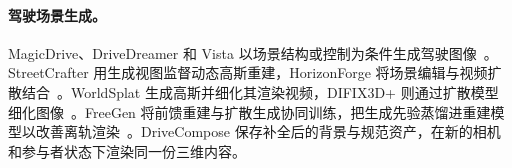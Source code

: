 \paragraph{驾驶场景生成。}
MagicDrive、DriveDreamer 和 Vista 以场景结构或控制为条件生成驾驶图像~\cite{gao2024magicdrive,wang2024drivedreamer,gao2024vista}。StreetCrafter 用生成视图监督动态高斯重建，HorizonForge 将场景编辑与视频扩散结合~\cite{streetcrafter,wang2026horizonforge}。WorldSplat 生成高斯并细化其渲染视频，DIFIX3D+ 则通过扩散模型细化图像~\cite{zhu2025worldsplat,wu2025difix3d}。FreeGen 将前馈重建与扩散生成协同训练，把生成先验蒸馏进重建模型以改善离轨渲染~\cite{chen2026freegen}。DriveCompose 保存补全后的背景与规范资产，在新的相机和参与者状态下渲染同一份三维内容。
